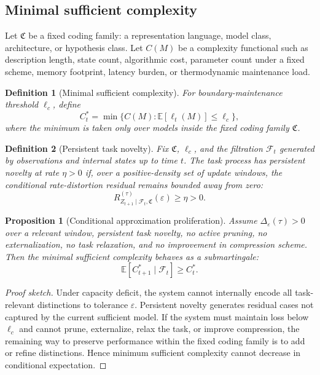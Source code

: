 \documentclass[10pt,a4paper,twocolumn,aps,prl]{revtex4-2}
\newtheorem{definition}{Definition}
\newtheorem{proposition}{Proposition}
\newcommand{\E}{\mathbb{E}}
\begin{document}
\subsection{Minimal sufficient complexity}

Let $\mathfrak{C}$ be a fixed coding family: a representation language, model class, architecture, or hypothesis class. Let $C(M)$ be a complexity functional such as description length, state count, algorithmic cost, parameter count under a fixed scheme, memory footprint, latency burden, or thermodynamic maintenance load.

\begin{definition}[Minimal sufficient complexity]
For boundary-maintenance threshold $\ell_c$, define
\begin{equation}
C_t^{*}=\min\{C(M):\E[\ell_t(M)]\leq \ell_c\},
\label{eq:min-sufficient-complexity}
\end{equation}
where the minimum is taken only over models inside the fixed coding family $\mathfrak{C}$.
\end{definition}

\begin{definition}[Persistent task novelty]
Fix $\mathfrak{C}$, $\ell_c$, and the filtration $\mathcal{F}_t$ generated by observations and internal states up to time $t$. The task process has persistent novelty at rate $\eta>0$ if, over a positive-density set of update windows, the conditional rate-distortion residual remains bounded away from zero:
\begin{equation}
R_{Z_{t+1}\mid \mathcal{F}_t,\mathfrak{C}}^{(\tau)}(\varepsilon)\geq \eta>0.
\label{eq:persistent-novelty}
\end{equation}
\end{definition}

\begin{proposition}[Conditional approximation proliferation]
Assume $\Delta_{\varepsilon}(\tau)>0$ over a relevant window, persistent task novelty, no active pruning, no externalization, no task relaxation, and no improvement in compression scheme. Then the minimal sufficient complexity behaves as a submartingale:
\begin{equation}
\E[C_{t+1}^{*}\mid \mathcal{F}_t]\geq C_t^{*}.
\label{eq:submartingale-complexity}
\end{equation}
\end{proposition}

\begin{proof}[Proof sketch]
Under capacity deficit, the system cannot internally encode all task-relevant distinctions to tolerance $\varepsilon$. Persistent novelty generates residual cases not captured by the current sufficient model. If the system must maintain loss below $\ell_c$ and cannot prune, externalize, relax the task, or improve compression, the remaining way to preserve performance within the fixed coding family is to add or refine distinctions. Hence minimum sufficient complexity cannot decrease in conditional expectation.
\end{proof}
\end{document}
